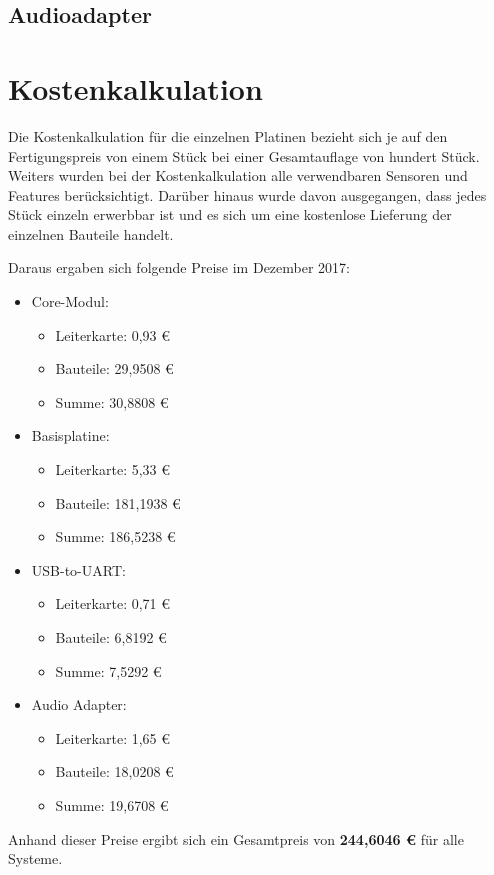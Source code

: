 \subsection{Audioadapter}
\label{sec:stücklisten-audio}

\section{Kostenkalkulation}
Die Kostenkalkulation für die einzelnen Platinen bezieht sich je auf den Fertigungspreis von einem Stück bei einer Gesamtauflage von hundert Stück. Weiters wurden bei der Kostenkalkulation alle verwendbaren Sensoren und Features berücksichtigt. Darüber hinaus wurde davon ausgegangen, dass jedes Stück einzeln erwerbbar ist und es sich um eine kostenlose Lieferung der einzelnen Bauteile handelt.

Daraus ergaben sich folgende Preise im Dezember 2017:
\begin{itemize}
    \item \gls{Core-Modul}:
    \begin{itemize}
        \item Leiterkarte: 0,93 €
        \item Bauteile: 29,9508 €
        \item Summe: 30,8808 €
    \end{itemize}
    \item \gls{Basisplatine}:
    \begin{itemize}
        \item Leiterkarte: 5,33 €
        \item Bauteile: 181,1938 €
        \item Summe: 186,5238 €
    \end{itemize}
    \item \gls{USB-to-UART}:
    \begin{itemize}
        \item Leiterkarte: 0,71 €
        \item Bauteile: 6,8192 €
        \item Summe: 7,5292 €
    \end{itemize}
    \item Audio Adapter:
    \begin{itemize}
        \item Leiterkarte: 1,65 €
        \item Bauteile: 18,0208 €
        \item Summe: 19,6708 €
    \end{itemize}
\end{itemize}

Anhand dieser Preise ergibt sich ein Gesamtpreis von \textbf{244,6046 €} für alle Systeme.